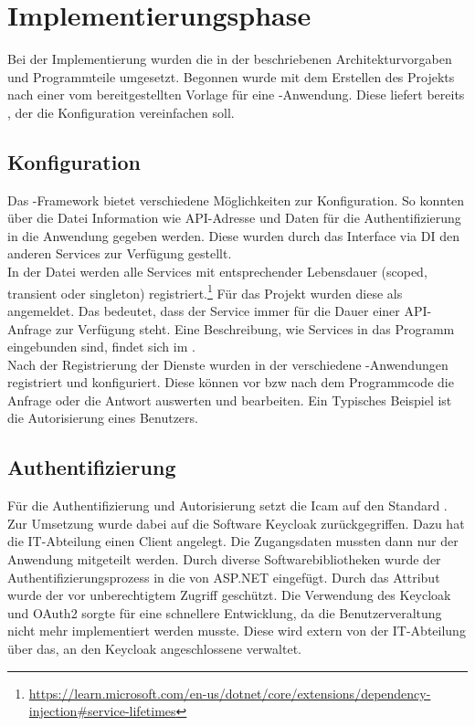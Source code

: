 \section{Implementierungsphase} 
\label{sec:Implementierungsphase}
Bei der Implementierung wurden die in der  beschriebenen Architekturvorgaben
und Programmteile umgesetzt. Begonnen wurde mit dem Erstellen des Projekts nach einer vom 
bereitgestellten Vorlage für eine -Anwendung. Diese liefert bereits ,
der \zB die Konfiguration vereinfachen soll.

\subsection{Konfiguration}
\label{sec:Konfiguration}
Das -Framework bietet verschiedene Möglichkeiten zur Konfiguration.
So konnten über die Datei  Information wie \acs{API}-Adresse und Daten für die
Authentifizierung in die Anwendung gegeben werden. Diese wurden durch das Interface 
via \acs{DI} den anderen Services zur Verfügung gestellt. \\
In der Datei  werden alle Services mit entsprechender Lebensdauer (scoped, transient oder singleton)
registriert.\footnote{\url{https://learn.microsoft.com/en-us/dotnet/core/extensions/dependency-injection\#service-lifetimes}}
Für das Projekt wurden diese als  angemeldet. Das bedeutet, dass der Service immer für die Dauer einer
\acs{API}-Anfrage zur Verfügung steht. Eine Beschreibung, wie Services in das Programm eingebunden sind, findet sich im 
.\\
Nach der Registrierung der Dienste wurden in der  verschiedene -Anwendungen 
registriert und konfiguriert. Diese können vor \acs{bzw} nach dem Programmcode die Anfrage oder die Antwort auswerten 
und bearbeiten. Ein Typisches Beispiel ist die Autorisierung eines Benutzers.

\subsection{Authentifizierung}
\label{sec:Authentifizierung}
Für die Authentifizierung und Autorisierung setzt die \acs{Icam} auf den Standard .
Zur Umsetzung wurde dabei auf die Software Keycloak zurückgegriffen. Dazu hat die IT-Abteilung einen Client 
angelegt. Die Zugangsdaten mussten dann nur der Anwendung mitgeteilt werden. Durch diverse Softwarebibliotheken 
wurde der Authentifizierungsprozess in die  von ASP.NET eingefügt. Durch das Attribut 
\Methode{[Authorize]} wurde der  vor unberechtigtem Zugriff geschützt. Die Verwendung 
des Keycloak und OAuth2 sorgte für eine schnellere Entwicklung, da die Benutzerveraltung nicht mehr implementiert
werden musste. Diese wird extern von der IT-Abteilung über das, an den Keycloak angeschlossene 
 verwaltet.

